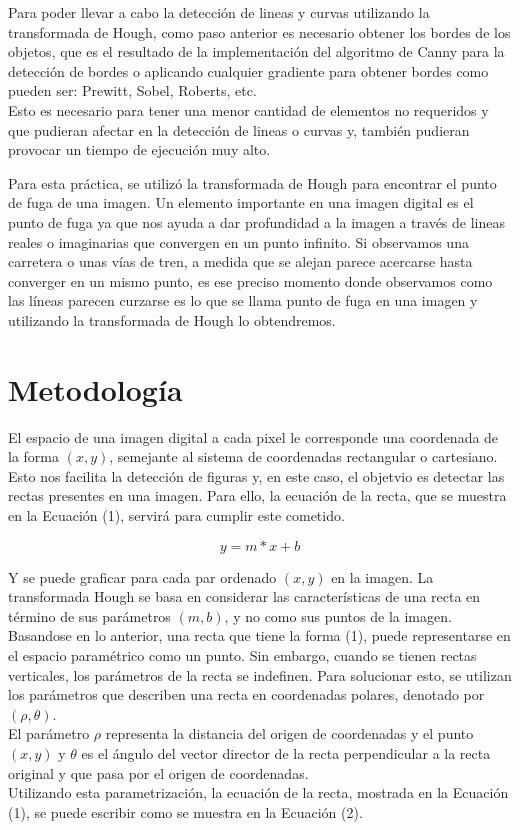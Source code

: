 \documentclass[conference]{IEEEtran}
\begin{document}
Para poder llevar a cabo la detecci\'on de lineas y curvas utilizando la transformada de Hough, como paso anterior es necesario obtener los bordes de los objetos, que es el resultado de la implementaci\'on del algoritmo de Canny para la detecci\'on de bordes o aplicando cualquier gradiente para obtener bordes como pueden ser: Prewitt, Sobel, Roberts, etc. \\
Esto es necesario para tener una menor cantidad de elementos no requeridos y que pudieran afectar en la detecci\'on de lineas o curvas y, tambi\'en pudieran provocar un tiempo de ejecuci\'on muy alto.

Para esta pr\'actica, se utiliz\'o la transformada de Hough para encontrar el punto de fuga de una imagen. Un elemento importante en una imagen digital es el punto de fuga ya que nos ayuda a dar profundidad a la imagen a trav\'es de lineas reales o imaginarias que convergen en un punto infinito. Si observamos una carretera o unas v\'ias de tren, a medida que se alejan parece acercarse hasta converger en un mismo punto, es ese preciso momento donde observamos como las l\'ineas parecen curzarse es lo que se llama punto de fuga en una imagen y utilizando la transformada de Hough lo obtendremos.\\

\section{Metodolog\'ia}
El espacio de una imagen digital a cada pixel le corresponde una coordenada de la forma $(x,y)$, semejante al sistema de coordenadas rectangular o cartesiano. Esto nos facilita la detecci\'on de figuras y, en este caso, el objetvio es detectar las rectas presentes en una imagen. Para ello, la ecuaci\'on de la recta, que se muestra en la Ecuaci\'on (1), servir\'a para cumplir este cometido.

\begin{equation}
	y = m*x + b
\end{equation}

Y se puede graficar para cada par ordenado $(x,y)$ en la imagen. La transformada Hough se basa en considerar las caracter\'isticas de una recta en t\'ermino de sus par\'ametros $(m,b)$, y no como sus puntos de la imagen. Basandose en lo anterior, una recta que tiene la forma (1), puede representarse en el espacio param\'etrico como un punto. Sin embargo, cuando se tienen rectas verticales, los par\'ametros de la recta se indefinen. Para solucionar esto, se utilizan los par\'ametros que describen una recta en coordenadas polares, denotado por $(\rho , \theta )$.\\
El par\'ametro $\rho$ representa la distancia del origen de coordenadas y el punto $(x,y)$ y $\theta$ es el \'angulo del vector director de la recta perpendicular a la recta original y que pasa por el origen de coordenadas.\\
Utilizando esta parametrizaci\'on, la ecuaci\'on de la recta, mostrada en la Ecuaci\'on (1), se puede escribir como se muestra en la Ecuaci\'on (2).
\end{document}

